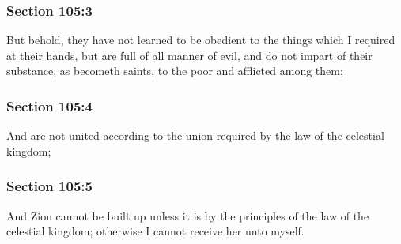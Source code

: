 	\subsubsection{Section 105:3} %
		\label{DC105-3}

		But behold, they have not learned to be obedient to the things which I required at their hands, but are full of all manner of evil, and do not impart of their substance, as becometh saints, to the poor and afflicted among them;


	\subsubsection{Section 105:4} %
		\label{DC105-4}

		And are not united according to the union required by the law of the celestial kingdom;


	\subsubsection{Section 105:5} %
		\label{DC105-5}

		And Zion cannot be built up unless it is by the principles of the law of the celestial kingdom; otherwise I cannot receive her unto myself.


